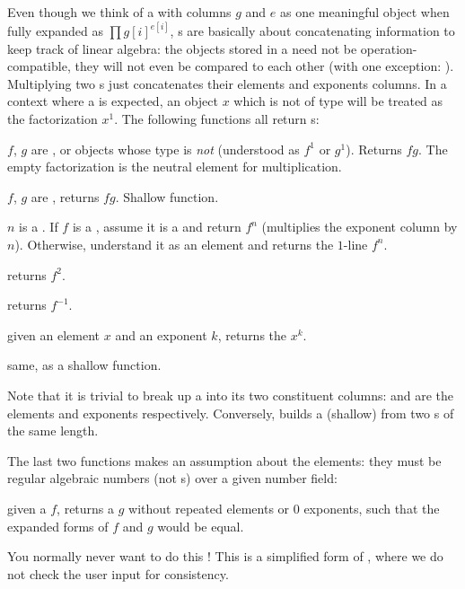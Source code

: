 Even though we think of a  with columns $g$ and $e$
as one meaningful object when fully expanded as $\prod g[i]^{e[i]}$,
s are basically about concatenating information to keep track of
linear algebra: the objects stored in a  need not be
operation-compatible, they will not even be compared to each other (with one
exception: ). Multiplying two s just
concatenates their elements and exponents columns. In a context where a
 is expected, an object $x$ which is not of type  will be
treated as the factorization $x^1$. The following functions all return
s:

 $f$, $g$ are ,
or objects whose type is \emph{not}  (understood as $f^1$ or $g^1$).
Returns $fg$. The empty factorization is the neutral element for 
multiplication.

 $f$, $g$ are , returns
$fg$. Shallow function.

 $n$ is a . If $f$ is a ,
assume it is a  and return $f^n$ (multiplies the exponent column
by $n$). Otherwise, understand it as an element and returns the $1$-line
 $f^n$.

 returns $f^2$.

 returns $f^{-1}$.

 given an element $x$ and an exponent
$k$, returns the  $x^k$.

 same, as a shallow function.

Note that it is trivial to break up a  into its two constituent
columns:  and  are the elements and exponents
respectively. Conversely,  builds a (shallow)  from
two s of the same length.

The last two functions makes an assumption about the elements: they must be
regular algebraic numbers (not s) over a given number field:

 given a  $f$, returns a 
$g$ without repeated elements or 0 exponents, such that the expanded forms
of $f$ and $g$ would be equal.

 You normally never want to do this !
This is a simplified form of , where we do not check the
user input for consistency.

